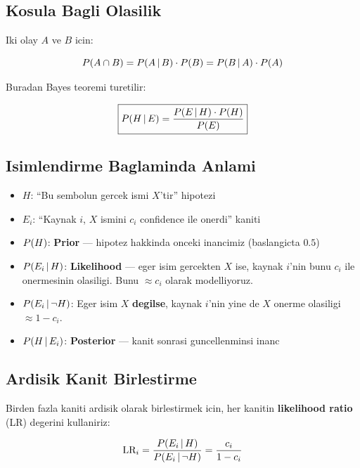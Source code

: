 \subsection{Kosula Bagli Olasilik}

Iki olay $A$ ve $B$ icin:

\begin{equation}
P\!\left(A \cap B\right) = P\!\left(A \,|\, B\right) \cdot P\!\left(B\right) = P\!\left(B \,|\, A\right) \cdot P\!\left(A\right)
\label{eq:joint-prob}
\end{equation}

Buradan Bayes teoremi turetilir:

\begin{equation}
\boxed{
P\!\left(H \,|\, E\right) = \frac{P\!\left(E \,|\, H\right) \cdot P\!\left(H\right)}{P\!\left(E\right)}
}
\label{eq:bayes-theorem}
\end{equation}

\subsection{Isimlendirme Baglaminda Anlami}

\begin{itemize}
\item $H$: ``Bu sembolun gercek ismi $X$'tir'' hipotezi
\item $E_i$: ``Kaynak $i$, $X$ ismini $c_i$ confidence ile onerdi'' kaniti
\item $P\!\left(H\right)$: \textbf{Prior} --- hipotez hakkinda onceki inancimiz (baslangicta $0.5$)
\item $P\!\left(E_i \,|\, H\right)$: \textbf{Likelihood} --- eger isim gercekten $X$ ise, kaynak $i$'nin bunu $c_i$ ile onermesinin olasiligi. Bunu $\approx c_i$ olarak modelliyoruz.
\item $P\!\left(E_i \,|\, \neg H\right)$: Eger isim $X$ \textbf{degilse}, kaynak $i$'nin yine de $X$ onerme olasiligi $\approx 1 - c_i$.
\item $P\!\left(H \,|\, E_i\right)$: \textbf{Posterior} --- kanit sonrasi guncellenminsi inanc
\end{itemize}

\subsection{Ardisik Kanit Birlestirme}

Birden fazla kaniti ardisik olarak birlestirmek icin, her kanitin \textbf{likelihood ratio} (LR) degerini kullaniriz:

\begin{equation}
\text{LR}_i = \frac{P\!\left(E_i \,|\, H\right)}{P\!\left(E_i \,|\, \neg H\right)} = \frac{c_i}{1 - c_i}
\label{eq:lr}
\end{equation}

